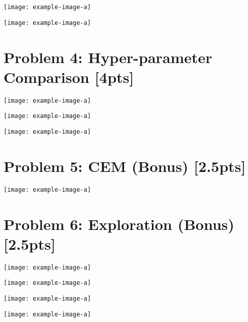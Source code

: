 \documentclass{article}
\begin{document}
\begin{answer}[title=Plot 2,height=9.5cm,width=\linewidth]
\centering
\texttt{[image: example-image-a]}
\end{answer}

\begin{answer}[title=Plot 3,height=9.5cm,width=\linewidth]
\centering
\texttt{[image: example-image-a]}
\end{answer}

\section{Problem 4: Hyper-parameter Comparison [4pts]}
\begin{answer}[title=Plot 1,height=9.5cm,width=\linewidth]
\centering
\texttt{[image: example-image-a]}
\end{answer}


\begin{answer}[title=Plot 2,height=9.5cm,width=\linewidth]
\centering
\texttt{[image: example-image-a]}
\end{answer}

\begin{answer}[title=Plot 3,height=9.5cm,width=\linewidth]
\centering
\texttt{[image: example-image-a]}
\end{answer}

\section{Problem 5: CEM (Bonus) [2.5pts]}
\begin{answer}[title=Plot 1,height=9.5cm,width=\linewidth]
\centering
\texttt{[image: example-image-a]}
\end{answer}

\section{Problem 6: Exploration (Bonus) [2.5pts]}
\begin{answer}[title=Plot 1,height=9.5cm,width=\linewidth]
\centering
\texttt{[image: example-image-a]}
\end{answer}

\begin{answer}[title=Plot 2,height=9.5cm,width=\linewidth]
\centering
\texttt{[image: example-image-a]}
\end{answer}

\begin{answer}[title=Plot 3,height=9.5cm,width=\linewidth]
\centering
\texttt{[image: example-image-a]}
\end{answer}

\begin{answer}[title=Plot 4,height=9.5cm,width=\linewidth]
\centering
\texttt{[image: example-image-a]}
\end{answer}
\end{document}
